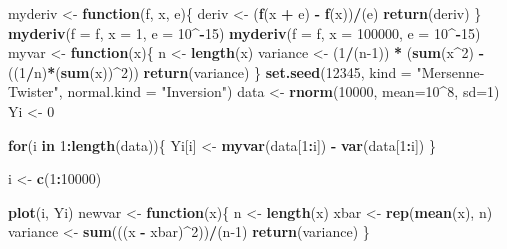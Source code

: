 \documentclass[]{article}
\newenvironment{Shaded}{\begin{snugshade}}{\end{snugshade}}
\newcommand{\ControlFlowTok}[1]{\textcolor[rgb]{0.13,0.29,0.53}{\textbf{#1}}}
\newcommand{\DataTypeTok}[1]{\textcolor[rgb]{0.13,0.29,0.53}{#1}}
\newcommand{\DecValTok}[1]{\textcolor[rgb]{0.00,0.00,0.81}{#1}}
\newcommand{\KeywordTok}[1]{\textcolor[rgb]{0.13,0.29,0.53}{\textbf{#1}}}
\newcommand{\NormalTok}[1]{#1}
\newcommand{\OperatorTok}[1]{\textcolor[rgb]{0.81,0.36,0.00}{\textbf{#1}}}
\newcommand{\StringTok}[1]{\textcolor[rgb]{0.31,0.60,0.02}{#1}}
\begin{document}
\begin{Shaded}
\begin{Highlighting}[]
{{\NormalTok{myderiv <-}\StringTok{ }\ControlFlowTok{function}\NormalTok{(f, x, e)\{}
\NormalTok{  deriv <-}\StringTok{ }\NormalTok{(}\KeywordTok{f}\NormalTok{(x }\OperatorTok{+}\StringTok{ }\NormalTok{e) }\OperatorTok{-}\StringTok{ }\KeywordTok{f}\NormalTok{(x))}\OperatorTok{/}\NormalTok{(e)}
  \KeywordTok{return}\NormalTok{(deriv)}
\NormalTok{\}}
\KeywordTok{myderiv}\NormalTok{(}\DataTypeTok{f =}\NormalTok{ f, }\DataTypeTok{x =} \DecValTok{1}\NormalTok{, }\DataTypeTok{e =} \DecValTok{10}\OperatorTok{^-}\DecValTok{15}\NormalTok{)}
\KeywordTok{myderiv}\NormalTok{(}\DataTypeTok{f =}\NormalTok{ f, }\DataTypeTok{x =} \DecValTok{100000}\NormalTok{, }\DataTypeTok{e =} \DecValTok{10}\OperatorTok{^-}\DecValTok{15}\NormalTok{)}
\NormalTok{myvar <-}\StringTok{ }\ControlFlowTok{function}\NormalTok{(x)\{}
\NormalTok{  n <-}\StringTok{ }\KeywordTok{length}\NormalTok{(x)}
\NormalTok{  variance <-}\StringTok{ }\NormalTok{(}\DecValTok{1}\OperatorTok{/}\NormalTok{(n}\DecValTok{-1}\NormalTok{)) }\OperatorTok{*}\StringTok{ }\NormalTok{(}\KeywordTok{sum}\NormalTok{(x}\OperatorTok{^}\DecValTok{2}\NormalTok{) }\OperatorTok{-}\StringTok{ }\NormalTok{((}\DecValTok{1}\OperatorTok{/}\NormalTok{n)}\OperatorTok{*}\NormalTok{(}\KeywordTok{sum}\NormalTok{(x))}\OperatorTok{^}\DecValTok{2}\NormalTok{))}
  \KeywordTok{return}\NormalTok{(variance)}
\NormalTok{\}}
\KeywordTok{set.seed}\NormalTok{(}\DecValTok{12345}\NormalTok{, }\DataTypeTok{kind =} \StringTok{"Mersenne-Twister"}\NormalTok{, }\DataTypeTok{normal.kind =} \StringTok{"Inversion"}\NormalTok{)}
\NormalTok{data <-}\StringTok{ }\KeywordTok{rnorm}\NormalTok{(}\DecValTok{10000}\NormalTok{, }\DataTypeTok{mean=}\DecValTok{10}\OperatorTok{^}\DecValTok{8}\NormalTok{, }\DataTypeTok{sd=}\DecValTok{1}\NormalTok{)}
\NormalTok{Yi <-}\StringTok{ }\DecValTok{0}

\ControlFlowTok{for}\NormalTok{(i }\ControlFlowTok{in} \DecValTok{1}\OperatorTok{:}\KeywordTok{length}\NormalTok{(data))\{}
\NormalTok{  Yi[i] <-}\StringTok{ }\KeywordTok{myvar}\NormalTok{(data[}\DecValTok{1}\OperatorTok{:}\NormalTok{i]) }\OperatorTok{-}\StringTok{ }\KeywordTok{var}\NormalTok{(data[}\DecValTok{1}\OperatorTok{:}\NormalTok{i])}
\NormalTok{\}}

\NormalTok{i <-}\StringTok{ }\KeywordTok{c}\NormalTok{(}\DecValTok{1}\OperatorTok{:}\DecValTok{10000}\NormalTok{)}
  
\KeywordTok{plot}\NormalTok{(i, Yi)}
\NormalTok{newvar <-}\StringTok{ }\ControlFlowTok{function}\NormalTok{(x)\{}
\NormalTok{  n <-}\StringTok{ }\KeywordTok{length}\NormalTok{(x)}
\NormalTok{  xbar <-}\StringTok{ }\KeywordTok{rep}\NormalTok{(}\KeywordTok{mean}\NormalTok{(x), n)}
\NormalTok{  variance <-}\StringTok{ }\KeywordTok{sum}\NormalTok{(((x }\OperatorTok{-}\StringTok{ }\NormalTok{xbar)}\OperatorTok{^}\DecValTok{2}\NormalTok{))}\OperatorTok{/}\NormalTok{(n}\DecValTok{-1}\NormalTok{)}
  \KeywordTok{return}\NormalTok{(variance)}
\NormalTok{\}}

}}
\end{Highlighting}
\end{Shaded}
\end{document}
